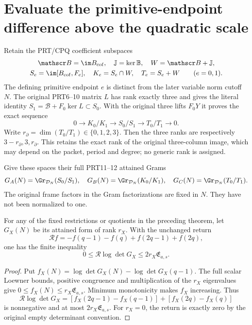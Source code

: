 \section{Evaluate the primitive-endpoint difference above the quadratic scale}
Retain the PRT/CPQ coefficient subspaces
\begin{equation}
\begin{gathered}
 \mathscr B=\im B_{\rm cof},\quad \mathbb J=\ker\mathbb B,\quad
 W=\mathscr B+\mathbb J,\\
 S_e=\im[B_{\rm cof},F_e],\quad K_e=S_e\cap W,\quad
 T_e=S_e+W\qquad(e=0,1).
\end{gathered}\label{peq:peq:spaces}
\end{equation}
The defining primitive endpoint $e$ is distinct from the later variable norm cutoff $N$. The original PRT6--10 matrix $L$ has rank exactly three and gives the literal identity $S_1=\mathscr B+F_0\ker L\subset S_0$. With the original three lifts $F_0Y$ it proves the exact sequence
\begin{equation}
 0\longrightarrow K_0/K_1\longrightarrow S_0/S_1
            \longrightarrow T_0/T_1\longrightarrow0.
 \label{peq:peq:sequence}
\end{equation}
Write $r_\partial=\dim(T_0/T_1)\in\{0,1,2,3\}$. Then the three ranks are respectively $3-r_\partial,3,r_\partial$. This retains the exact rank of the original three-column image, which may depend on the packet, period and degree; no generic rank is assigned.

Give these spaces their full PRT11--12 attained Grams
\[
 G_A(N)=\Gr_{\mathcal D_N}(S_0/S_1),\quad
 G_B(N)=\Gr_{\mathcal D_N}(K_0/K_1),\quad
 G_C(N)=\Gr_{\mathcal D_N}(T_0/T_1).
\]
The original frame factors in the Gram factorizations are fixed in $N$. They have not been normalized to one.

\begin{lemma}
For any of the fixed restrictions or quotients in the preceding theorem, let $G_X(N)$ be its attained form of rank $r_X$. With the unchanged return
\[
 \mathcal R f=-f(q-1)-f(q)+f(2q-1)+f(2q),
\]
one has the finite inequality
\begin{equation}
 \boxed{0\le\mathcal R\log\det G_X\le2r_X\mathfrak E_{a,s}.}
 \label{peq:peq:quotreturn}
\end{equation}
\end{lemma}
\begin{proof}
Put $f_X(N)=\log\det G_X(N)-\log\det G_X(q-1)$. The full scalar Loewner bounds, positive congruence and multiplication of the $r_X$ eigenvalues give
$0\le f_X(N)\le r_X\mathfrak E_{a,s}$. Minimum monotonicity makes $f_X$ increasing. Thus
\[
 \mathcal R\log\det G_X
       =[f_X(2q-1)-f_X(q-1)]+[f_X(2q)-f_X(q)]
\]
is nonnegative and at most $2r_X\mathfrak E_{a,s}$.
For $r_X=0$, the return is exactly zero by the original empty determinant convention.
\end{proof}

